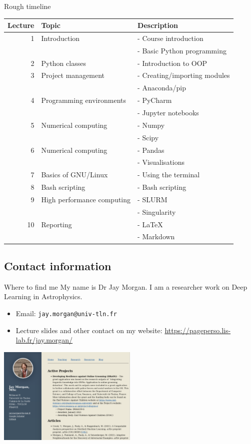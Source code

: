 \documentclass[10pt]{beamer}
\begin{document}
\begin{frame}[label={sec:org571a182}]{Rough timeline}
\begin{center}
\scriptsize
\begin{tabular}{rll}
\toprule
Lecture & Topic & Description\\
\midrule
1 & Introduction & - Course introduction\\
 &  & - Basic Python programming\\
2 & Python classes & - Introduction to OOP\\
3 & Project management & - Creating/importing modules\\
 &  & - Anaconda/pip\\
4 & Programming environments & - PyCharm\\
 &  & - Jupyter notebooks\\
5 & Numerical computing & - Numpy\\
 &  & - Scipy\\
6 & Numerical computing & - Pandas\\
 &  & - Visualisations\\
7 & Basics of GNU/Linux & - Using the terminal\\
8 & Bash scripting & - Bash scripting\\
9 & High performance computing & - SLURM\\
 &  & - Singularity\\
10 & Reporting & - \LaTeX{}\\
 &  & - Markdown\\
\bottomrule
\end{tabular}
\end{center}
\end{frame}

\subsection{Contact information}
\label{sec:org41ff117}

\begin{frame}[label={sec:orgb72abc9},fragile]{Where to find me}
 My name is Dr Jay Morgan. I am a researcher work on Deep Learning in Astrophysics.

\begin{itemize}
\item Email: \texttt{jay.morgan@univ-tln.fr}
\item Lecture slides and other contact on my website: \url{https://pageperso.lis-lab.fr/jay.morgan/}
\end{itemize}

\begin{center}
\includegraphics[width=0.5\textwidth]{./images/website.png}
\end{center}
\end{frame}
\end{document}
